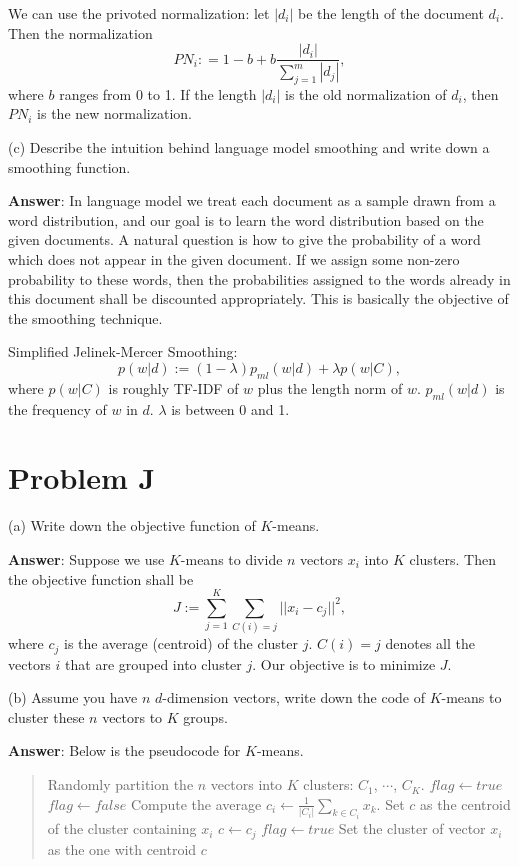 \documentclass{article}
\begin{document}
We can use the privoted normalization: let $|d_i|$ be the length of the document $d_i$. Then the normalization
$$PN_i : = 1- b + b\frac{|d_i|}{\sum_{j=1}^m |d_j|},$$
where $b$ ranges from 0 to 1. If the length $|d_i|$ is the old normalization of $d_i$, then $PN_i$ is the new normalization. 

(c) Describe the intuition behind language model smoothing and write down a smoothing function.

{\bf Answer}: 
In language model we treat each document as a sample drawn from a word distribution, and our goal is to learn the word distribution based on the given documents. A natural question is how to give the probability of a word which does not appear in the given document. If we assign some non-zero probability to these words, then the probabilities assigned to the words already in this document shall be discounted appropriately. This is basically the objective of the smoothing technique.

Simplified Jelinek-Mercer Smoothing:
$$p(w | d) := (1-\lambda) p_{ml}(w | d) + \lambda p(w | C),$$
where $p(w | C)$ is roughly TF-IDF of $w$ plus the length norm of $w$. $p_{ml}(w | d)$ is the frequency of $w$ in $d$. $\lambda$ is between 0 and 1.

\section{Problem J}
(a) Write down the objective function of $K$-means.

{\bf Answer}:
Suppose we use $K$-means to divide $n$ vectors $x_i$ into $K$ clusters. Then the objective function shall be
$$J := \sum_{j=1} ^K \sum_{C(i) = j} ||x_i - c_j||^2,$$
where $c_j$ is the average (centroid) of the cluster $j$. $C(i) = j$ denotes all the vectors $i$ that are grouped into cluster $j$. Our objective is to minimize $J$.

(b) Assume you have $n$ $d$-dimension vectors, write down the code of $K$-means to cluster these $n$ vectors to $K$ groups.

{\bf Answer}: Below is the pseudocode for $K$-means.
\begin{quote}
\centering
\begin{algorithmic}
\State Randomly partition the $n$ vectors into $K$ clusters: $C_1$, $\cdots$, $C_K$.
\State $flag \gets true$
  \State $flag \gets false$
    \State Compute the average $c_i \gets \frac{1}{|C_i|}\sum_{k\in C_i} x_k$.
  \EndFor
    \State Set $c$ as the centroid of the cluster containing $x_i$
        \State $c \gets c_j$
        \State $flag \gets true$
      \EndIf
    \EndFor
    \State  Set the cluster of vector $x_i$ as the one with centroid $c$
  \EndFor
\EndWhile
\end{algorithmic}
\end{quote}
\end{document}
